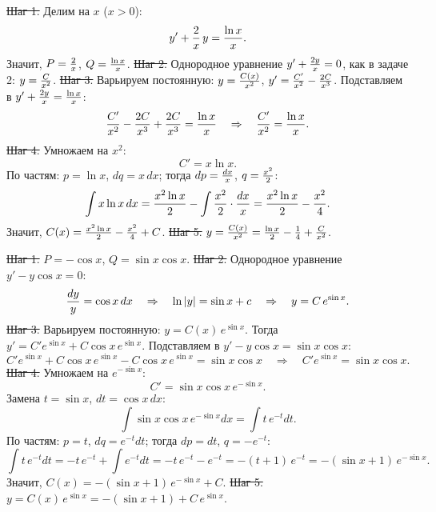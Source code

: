 \st{Шаг 1.} Делим на $x$ ($x>0$):
$$y'+{2\over x}\,y={\ln x\over x}.$$
Значит, $P={2\over x}$, $Q={\ln x\over x}$.
\st{Шаг 2.} Однородное уравнение $y'+{2y\over x}=0$, как в задаче 2:
$y={C\over x^2}$.
\st{Шаг 3.} Варьируем постоянную: $y={C(x)\over x^2}$,
$y'={C'\over x^2}-{2C\over x^3}$. Подставляем в
$y'+{2y\over x}={\ln x\over x}$:
$${C'\over x^2}-{2C\over x^3}+{2C\over x^3}={\ln x\over x}\quad\Rightarrow\quad
{C'\over x^2}={\ln x\over x}.$$
\st{Шаг 4.} Умножаем на $x^2$:
$$C'=x\ln x.$$
По частям: $p=\ln x$, $dq=x\,dx$; тогда $dp={dx\over x}$, $q={x^2\over2}$:
$$\int x\ln x\,dx={x^2\ln x\over2}-\int{x^2\over2}\cdot{dx\over x}
={x^2\ln x\over2}-{x^2\over4}.$$
Значит, $C(x)={x^2\ln x\over2}-{x^2\over4}+C$.
\st{Шаг 5.} $y={C(x)\over x^2}={\ln x\over2}-{1\over4}+{C\over x^2}$.

\st{Шаг 1.} $P=-\cos x$, $Q=\sin x\cos x$.
\st{Шаг 2.} Однородное уравнение $y'-y\cos x=0$:
$${dy\over y}=\cos x\,dx\quad\Rightarrow\quad\ln|y|=\sin x+c
\quad\Rightarrow\quad y=C\,e^{\sin x}.$$
\st{Шаг 3.} Варьируем постоянную: $y=C(x)\,e^{\sin x}$. Тогда
$y'=C'e^{\sin x}+C\cos x\,e^{\sin x}$. Подставляем в
$y'-y\cos x=\sin x\cos x$:
$$C'e^{\sin x}+C\cos x\,e^{\sin x}-C\cos x\,e^{\sin x}=\sin x\cos x
\quad\Rightarrow\quad C'e^{\sin x}=\sin x\cos x.$$
\st{Шаг 4.} Умножаем на $e^{-\sin x}$:
$$C'=\sin x\cos x\,e^{-\sin x}.$$
Замена $t=\sin x$, $dt=\cos x\,dx$:
$$\int\sin x\cos x\,e^{-\sin x}dx=\int t\,e^{-t}dt.$$
По частям: $p=t$, $dq=e^{-t}dt$; тогда $dp=dt$, $q=-e^{-t}$:
$$\int t\,e^{-t}dt=-t\,e^{-t}+\int e^{-t}dt=-t\,e^{-t}-e^{-t}
=-(t+1)\,e^{-t}=-(\sin x+1)\,e^{-\sin x}.$$
Значит, $C(x)=-(\sin x+1)\,e^{-\sin x}+C$.
\st{Шаг 5.} $y=C(x)\,e^{\sin x}=-(\sin x+1)+C\,e^{\sin x}$.

\bye
